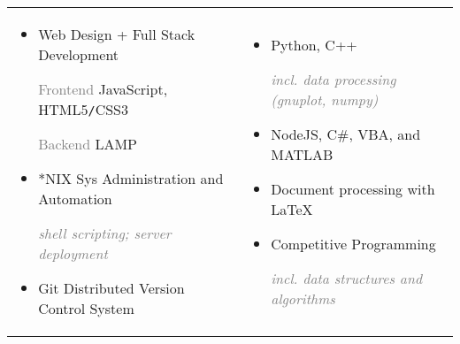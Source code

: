 \documentclass[11pt]{article}
\begin{document}

		{
			\renewcommand{\arraystretch}{1.5}
			\setlength{\tabcolsep}{12pt}
			\begin{tabularx}{\textwidth}{@{} p{} p{} @{}}
				\vspace{-1em}
				\begin{itemize}[leftmargin=3mm]
					\renewcommand\labelitemi{}
					\setlength\itemsep{0.8em}
					\item Web Design + Full Stack Development \par
						\vspace{1mm}
						\hspace{1em} \textcolor{gray}{Frontend} \hfill JavaScript, HTML\textcolor{Bittersweet}{5}\texttt{/}CSS\textcolor{Bittersweet}{3} \par
						\hspace{1em} \textcolor{gray}{Backend} \hfill LAMP 
					\item \**NIX Sys Administration and Automation \par
						\hfill \textcolor{gray}{\footnotesize \itshape shell scripting; server deployment}
					\item Git Distributed Version Control System
				\end{itemize} & 
				\vspace{-1em}
				\begin{itemize}[leftmargin=3mm]
					\renewcommand\labelitemi{}
					\setlength\itemsep{0.9em}
					\item Python, C++ \par %
					\hfill \textcolor{gray}{\footnotesize \itshape incl. data processing (gnuplot, numpy)}
					\item NodeJS, C\#, VBA, and MATLAB
					\item Document processing with{\fontfamily{cmr} \selectfont \LaTeX} 
					\item Competitive Programming \par \hfill \textcolor{gray}{\footnotesize \itshape incl. data structures and algorithms}
				\end{itemize}


\end{tabularx}}
\end{document}
